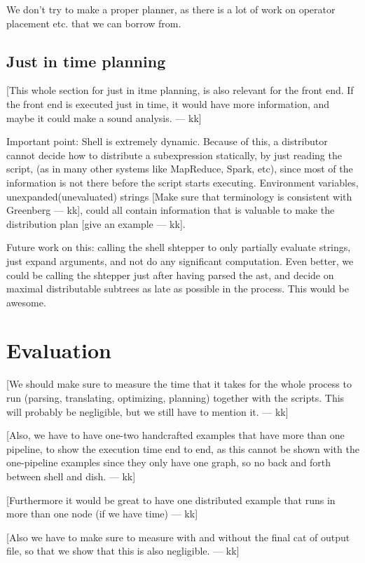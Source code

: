 \documentclass[sigplan,10pt,review,anonymous]{acmart}
\newcommand{\kk}[1]{[{\color{magenta}#1 --- kk}]}
\begin{document}
We don't try to make a proper planner, as there is a lot of work on
operator placement etc. that we can borrow from.


\subsection{Just in time planning}

\kk{This whole section for just in itme planning, is also relevant for
  the front end. If the front end is executed just in time, it would
  have more information, and maybe it could make a sound analysis.}

Important point: Shell is extremely dynamic. Because of this, a
distributor cannot decide how to distribute a subexpression
statically, by just reading the script, (as in many other systems like
MapReduce, Spark, etc), since most of the information is not there
before the script starts executing. Environment variables,
unexpanded(unevaluated) strings \kk{Make sure that terminology is
  consistent with Greenberg}, could all contain information that is
valuable to make the distribution plan \kk{give an example}.


Future work on this: calling the shell shtepper to only partially
evaluate strings, just expand arguments, and not do any significant
computation. Even better, we could be calling the shtepper just after
having parsed the ast, and decide on maximal distributable subtrees as
late as possible in the process. This would be awesome.

\section{Evaluation}

\kk{We should make sure to measure the time that it takes for the
  whole process to run (parsing, translating, optimizing, planning)
  together with the scripts. This will probably be negligible, but we
  still have to mention it. }

\kk{Also, we have to have one-two handcrafted examples that have more
  than one pipeline, to show the execution time end to end, as this
  cannot be shown with the one-pipeline examples since they only have
  one graph, so no back and forth between shell and dish.}

\kk{Furthermore it would be great to have one distributed example that
  runs in more than one node (if we have time)}

\kk{Also we have to make sure to measure with and without the final
  cat of output file, so that we show that this is also negligible.}
\end{document}
